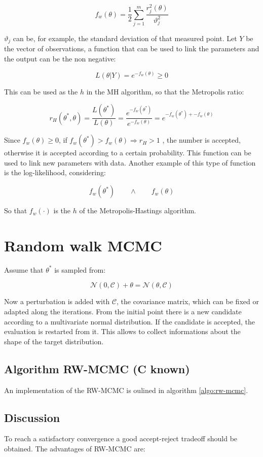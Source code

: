 $$f_w(\theta)=\frac{1}{2}\sum^m_{j=1} \frac{r^2_j(\theta)}{\vartheta_j^2}$$

$\vartheta_j$ can be, for example, the standard deviation of that measured point.
Let $Y$ be the vector of observations, a function that can be used to link the parameters and the output can be the non negative:

$$L(\theta|Y)=e^{-f_w(\theta)} \geq 0$$

This can be used as the $h$ in the MH algorithm, so that the Metropolis ratio:

$$r_H(\theta^*,\theta)=\frac{L(\theta^*)}{L(\theta)}=\frac{e^{-f_w(\theta^*)}}{e^{-f_w(\theta)}}=e^{-f_w(\theta^*)+-f_w(\theta)}$$

Since $f_w(\theta)\geq0$, if $f_w(\theta^*) > f_w(\theta) \Rightarrow r_H>1$ , the number is accepted, otherwise it is accepted according to a certain probability.
This function can be used to link new parameters with data.
Another example of this type of function is the log-likelihood, considering:

$$f_w(\theta^*)\qquad\land\qquad f_w(\theta)$$

So that $f_w(\cdot)$ is the $h$ of the Metropolis-Hastings algorithm.

\section{Random walk MCMC}
Assume that $\theta^*$ is sampled from:

$$\mathcal{N}(0,\mathcal{C})+\theta=\mathcal{N}(\theta,\mathcal{C})$$

Now a perturbation is added with $\mathcal{C}$, the covariance matrix, which can be fixed or adapted along the iterations.
From the initial point there is a new candidate according to a multivariate normal distribution.
If the candidate is accepted, the evaluation is restarted from it.
This allows to collect informations about the shape of the target distribution.


  \subsection{Algorithm RW-MCMC (C known)}
  An implementation of the RW-MCMC is oulined in algorithm \ref{algo:rw-mcmc}.

  

  \subsection{Discussion}
  To reach a satisfactory convergence a good accept-reject tradeoff should be obtained.
  The advantages of RW-MCMC are:

